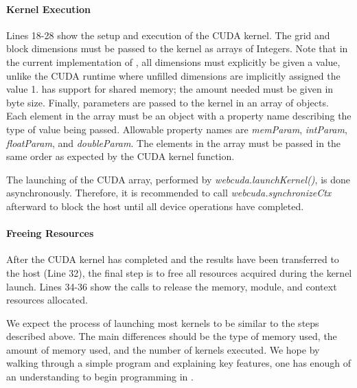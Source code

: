 \paragraph{Kernel Execution} Lines 18-28 show the setup and execution of the
CUDA kernel. The grid and block dimensions must be passed to the kernel as
arrays of Integers. Note that in the current implementation of \namens, all
dimensions must explicitly be given a value, unlike the CUDA runtime where
unfilled dimensions are implicitly assigned the value 1. \name has support for
shared memory; the amount needed must be given in byte size. Finally, parameters
are passed to the kernel in an array of objects. Each element in the array must
be an object with a property name describing the type of value being passed.
Allowable property names are \textit{memParam}, \textit{intParam},
\textit{floatParam}, and \textit{doubleParam}. The elements in the array must be
passed in the same order as expected by the CUDA kernel function.

The launching of the CUDA array, performed by \textit{webcuda.launchKernel()}, is
done asynchronously. Therefore, it is recommended to call
\textit{webcuda.synchronizeCtx} afterward to block the host until all device operations
have completed.

\paragraph{Freeing Resources}
After the CUDA kernel has completed and the results have been transferred to the
host (Line 32), the final step is to free all resources acquired during the
kernel launch. Lines 34-36 show the \name calls to release the memory, module,
and context resources allocated.


We expect the process of launching most kernels to be similar to the steps
described above.  The main differences should be the type of memory used, the
amount of memory used, and the number of kernels executed. We hope by walking
through a simple program and explaining key \name features, one has enough of an
understanding to begin programming in \namens.

